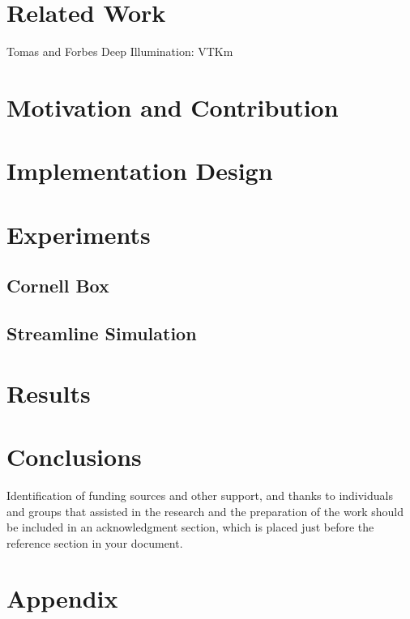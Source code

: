 \documentclass[sigconf,authordraft]{acmart}
\begin{document}
\section{Related Work}

Tomas and Forbes Deep Illumination: \cite{deepillum}
VTKm \cite{vtkm}


\section{Motivation and Contribution}

\section{Implementation Design}

\section{Experiments}

\subsection{Cornell Box}
\subsection{Streamline Simulation}

\section{Results}

\section{Conclusions}



\begin{acks}
Identification of funding sources and other support, and thanks to
individuals and groups that assisted in the research and the
preparation of the work should be included in an acknowledgment
section, which is placed just before the reference section in your
document.
\end{acks}




\appendix

\section{Appendix}
\end{document}
